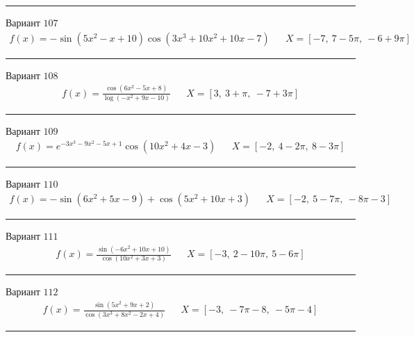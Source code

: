 \documentclass[11pt]{report}
\begin{document}
\begin{center}
    \noindent\rule{8cm}{0.4pt}
\end{center}
Вариант \(107\)
\begin{align*}
    f(x) = - \sin{\left(5 x^{2} - x + 10 \right)} \cos{\left(3 x^{3} + 10 x^{2} + 10 x - 7 \right)} && X = \left[ -7, \  7 - 5 \pi, \  -6 + 9 \pi\right]
\end{align*}
\begin{center}
    \noindent\rule{8cm}{0.4pt}
\end{center}
Вариант \(108\)
\begin{align*}
    f(x) = \frac{\cos{\left(6 x^{2} - 5 x + 8 \right)}}{\log{\left(- x^{2} + 9 x - 10 \right)}} && X = \left[ 3, \  3 + \pi, \  -7 + 3 \pi\right]
\end{align*}
\begin{center}
    \noindent\rule{8cm}{0.4pt}
\end{center}
Вариант \(109\)
\begin{align*}
    f(x) = e^{- 3 x^{3} - 9 x^{2} - 5 x + 1} \cos{\left(10 x^{2} + 4 x - 3 \right)} && X = \left[ -2, \  4 - 2 \pi, \  8 - 3 \pi\right]
\end{align*}
\begin{center}
    \noindent\rule{8cm}{0.4pt}
\end{center}
Вариант \(110\)
\begin{align*}
    f(x) = - \sin{\left(6 x^{2} + 5 x - 9 \right)} + \cos{\left(5 x^{2} + 10 x + 3 \right)} && X = \left[ -2, \  5 - 7 \pi, \  - 8 \pi - 3\right]
\end{align*}
\begin{center}
    \noindent\rule{8cm}{0.4pt}
\end{center}
Вариант \(111\)
\begin{align*}
    f(x) = \frac{\sin{\left(- 6 x^{2} + 10 x + 10 \right)}}{\cos{\left(10 x^{2} + 3 x + 3 \right)}} && X = \left[ -3, \  2 - 10 \pi, \  5 - 6 \pi\right]
\end{align*}
\begin{center}
    \noindent\rule{8cm}{0.4pt}
\end{center}
Вариант \(112\)
\begin{align*}
    f(x) = \frac{\sin{\left(5 x^{2} + 9 x + 2 \right)}}{\cos{\left(3 x^{3} + 8 x^{2} - 2 x + 4 \right)}} && X = \left[ -3, \  - 7 \pi - 8, \  - 5 \pi - 4\right]
\end{align*}
\begin{center}
    \noindent\rule{8cm}{0.4pt}
\end{center}
\end{document}
